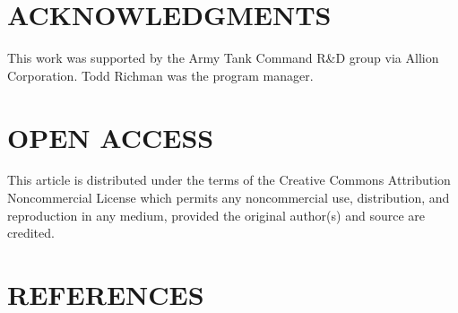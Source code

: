 \documentclass[10pt]{article}
\begin{document}
\section*{ACKNOWLEDGMENTS}
This work was supported by the Army Tank Command R\&D group via Allion Corporation. Todd Richman was the program manager.

\section*{OPEN ACCESS}
This article is distributed under the terms of the Creative Commons Attribution Noncommercial License which permits any noncommercial use, distribution, and reproduction in any medium, provided the original author(s) and source are credited.

\section*{REFERENCES}
\end{document}
